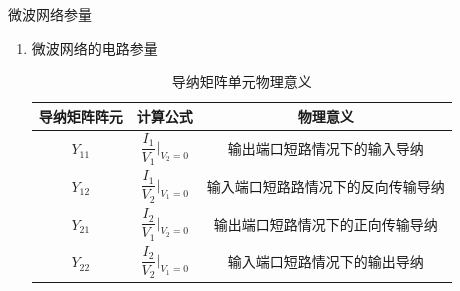 \begin{frame}{微波网络参量}
    \begin{enumerate}
        \item 微波网络的电路参量
              \begin{table}
                  \caption{导纳矩阵单元物理意义}
                  \footnotesize
                  \begin{tabular}{|c|c|c|}
                      \hline
                      \textbf{导纳矩阵阵元} & \textbf{计算公式}                        & \textbf{物理意义}     \\ \hline
                      $Y_{11}$        & $\dfrac{I_1}{V_1}\bigg\vert_{V_2=0}$ & 输出端口短路情况下的输入导纳    \\ \hline
                      $Y_{12}$        & $\dfrac{I_1}{V_2}\bigg\vert_{V_1=0}$ & 输入端口短路路情况下的反向传输导纳 \\ \hline
                      $Y_{21}$        & $\dfrac{I_2}{V_1}\bigg\vert_{V_2=0}$ & 输出端口短路情况下的正向传输导纳  \\ \hline
                      $Y_{22}$        & $\dfrac{I_2}{V_2}\bigg\vert_{V_1=0}$ & 输入端口短路情况下的输出导纳    \\ \hline
                  \end{tabular}
              \end{table}
    \end{enumerate}
\end{frame}

